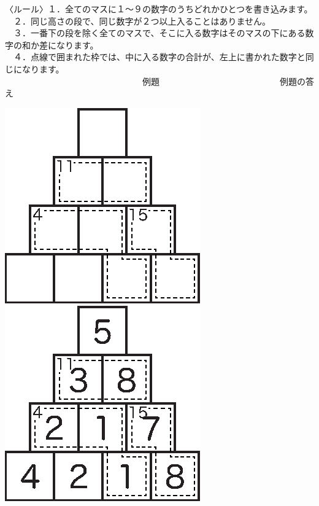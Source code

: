 \documentclass[./main]{subfiles}
\begin{document}
\noindent 〈ルール〉１．全てのマスに１〜９の数字のうちどれかひとつを書き込みます。\\
　２．同じ高さの段で、同じ数字が２つ以上入ることはありません。\\
　３．一番下の段を除く全てのマスで、そこに入る数字はそのマスの下にある数字の和か差になります。\\
　４．点線で囲まれた枠では、中に入る数字の合計が、左上に書かれた数字と同じになります。\\[15pt]
　　　　　　　　　　　　　　　　例題　　　　　　　　　　　　　　例題の答え
\begin{center}
\includegraphics{manuscript/morikawa_image/morikawa_puzzle_inst_p.eps}　　　　　
\includegraphics{manuscript/morikawa_image/morikawa_puzzle_inst_a.eps}
\end{center}
\end{document}
